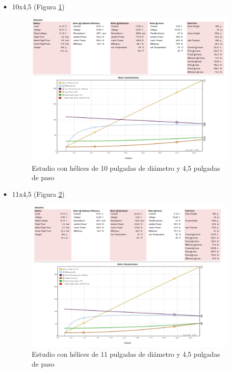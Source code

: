 \documentclass[12pt,twoside]{article}
\begin{document}
\begin{itemize}
\begin{itemize}
					\item 10x4,5 (Figura \ref{fig:10inch})
					\begin{figure}
								\centering
								\includegraphics[width=1\textwidth]{Imatges/Componentes/10x4_5.png}
								\caption{Estudio con hélices de 10 pulgadas de diámetro y 4,5 pulgadas de paso}
								\label{fig:10inch}
							\end{figure}
							
					\item 11x4,5 (Figura \ref{fig:11inch})
					\begin{figure}
								\centering
								\includegraphics[width=1\textwidth]{Imatges/Componentes/11x4_5.png}
								\caption{Estudio con hélices de 11 pulgadas de diámetro y 4,5 pulgadas de paso}
								\label{fig:11inch}
							\end{figure}
							

\end{itemize}
\end{itemize}
\end{document}
